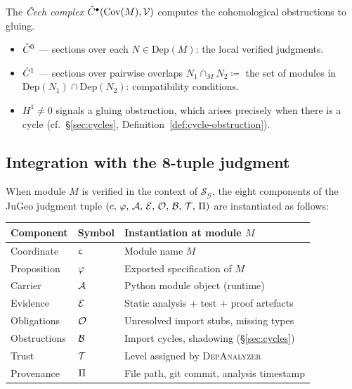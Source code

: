 \documentclass[11pt]{article}
\newcommand{\IG}{\mathcal{G}}              %
\newcommand{\DA}{\textsc{DepAnalyzer}}     %
\newcommand{\Dep}{\mathrm{Dep}}            %
\newcommand{\ModSite}{\mathcal{S}_{\IG}}   %
\begin{document}
The \emph{\v{C}ech complex} $\check{C}^{\bullet}(\mathrm{Cov}(M), \mathcal{V})$
computes the cohomological obstructions to gluing.
\begin{itemize}
  \item $\check{C}^0$ — sections over each $N \in \Dep(M)$: the local
        verified judgments.
  \item $\check{C}^1$ — sections over pairwise overlaps
        $N_1 \cap_M N_2 \coloneqq$ the set of modules in
        $\Dep(N_1) \cap \Dep(N_2)$: compatibility conditions.
  \item $H^1 \neq 0$ signals a gluing obstruction, which arises
        precisely when there is a cycle
        (cf.\ \S\ref{sec:cycles}, Definition~\ref{def:cycle-obstruction}).
\end{itemize}

\subsection{Integration with the 8-tuple judgment}

When module $M$ is verified in the context of $\ModSite$, the
eight components of the JuGeo judgment tuple
$(c,\,\varphi,\,\mathcal{A},\,\mathcal{E},\,\mathcal{O},\,\mathcal{B},\,\mathcal{T},\,\Pi)$
are instantiated as follows:

\begin{center}
\begin{tabular}{lll}
\toprule
\textbf{Component} & \textbf{Symbol} & \textbf{Instantiation at module $M$} \\
\midrule
Coordinate  & $\mathsf{c}$  & Module name $M$ \\
Proposition & $\varphi$   & Exported specification of $M$ \\
Carrier     & $\mathcal{A}$& Python module object (runtime) \\
Evidence    & $\mathcal{E}$   & Static analysis + test + proof artefacts \\
Obligations & $\mathcal{O}$  & Unresolved import stubs, missing types \\
Obstructions& $\mathcal{B}$  & Import cycles, shadowing (\S\ref{sec:cycles}) \\
Trust       & $\mathcal{T}$  & Level assigned by \DA{} \\
Provenance  & $\Pi$   & File path, git commit, analysis timestamp \\
\bottomrule
\end{tabular}
\end{center}

\end{document}
